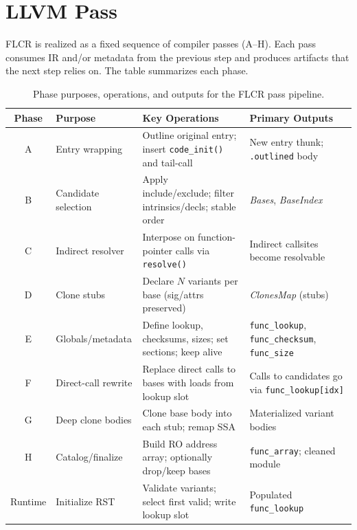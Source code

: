 \section*{LLVM Pass}
FLCR is realized as a fixed sequence of compiler passes (A–H). Each pass consumes
IR and/or metadata from the previous step and produces artifacts that the next step
relies on. The table summarizes each phase.

\begin{table}[t]
  \centering
  \renewcommand{\arraystretch}{1.15}
  \begin{tabularx}{\linewidth}{|c|X|X|X|}
    \hline
    \textbf{Phase} & \textbf{Purpose} & \textbf{Key Operations} & \textbf{Primary Outputs} \\ \hline
    A & Entry wrapping & Outline original entry; insert \texttt{code\_init()} and tail-call & New entry thunk; \texttt{.outlined} body \\ \hline
    B & Candidate selection & Apply include/exclude; filter intrinsics/decls; stable order & \textit{Bases}, \textit{BaseIndex} \\ \hline
    C & Indirect resolver & Interpose on function-pointer calls via \texttt{resolve()} & Indirect callsites become resolvable \\ \hline
    D & Clone stubs & Declare \(N\) variants per base (sig/attrs preserved) & \textit{ClonesMap} (stubs) \\ \hline
    E & Globals/metadata & Define lookup, checksums, sizes; set sections; keep alive & \texttt{func\_lookup}, \texttt{func\_checksum}, \texttt{func\_size} \\ \hline
    F & Direct-call rewrite & Replace direct calls to bases with loads from lookup slot & Calls to candidates go via \texttt{func\_lookup[idx]} \\ \hline
    G & Deep clone bodies & Clone base body into each stub; remap SSA & Materialized variant bodies \\ \hline
    H & Catalog/finalize & Build RO address array; optionally drop/keep bases & \texttt{func\_array}; cleaned module \\ \hline
    Runtime & Initialize RST & Validate variants; select first valid; write lookup slot & Populated \texttt{func\_lookup} \\ \hline
  \end{tabularx}
  \caption{Phase purposes, operations, and outputs for the FLCR pass pipeline.}
  \label{tab:flcr-pass-layout}
\end{table}

